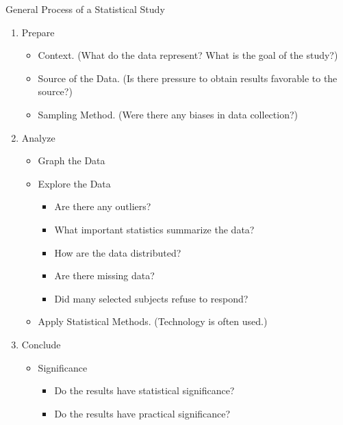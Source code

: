 \documentclass{beamer}
\begin{document}
\begin{frame}
\begin{block}{General Process of a Statistical Study}
\begin{enumerate}
\item Prepare
\begin{itemize}
\item Context. (What do the data represent? What is the goal of the study?)
\item Source of the Data. (Is there pressure to obtain results favorable to the source?) 
\item Sampling Method. (Were there any biases in data collection?)
\end{itemize}\pause
\item Analyze
\begin{itemize}
\item Graph the Data
\item Explore the Data
\begin{itemize}
\item Are there any outliers?
\item What important statistics summarize the data?
\item How are the data distributed?
\item Are there missing data?
\item Did many selected subjects refuse to respond?
\end{itemize}
\item Apply Statistical Methods. (Technology is often used.)
\end{itemize}\pause
\item Conclude
\begin{itemize}
\item Significance
\begin{itemize}
\item Do the results have statistical significance?
\item Do the results have practical significance?
\end{itemize}
\end{itemize}
\end{enumerate}
\end{block}
\end{frame}
\end{document}
